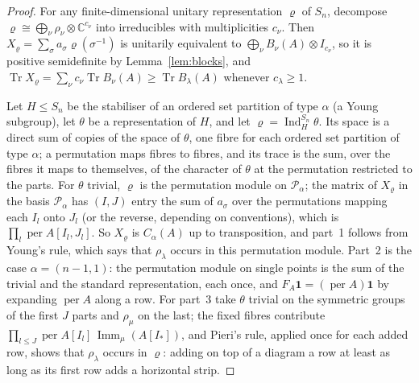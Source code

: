 \documentclass[11pt,a4paper]{article}
\theoremstyle{remark}
\newcommand{\per}{\operatorname{per}}
\newcommand{\Tr}{\operatorname{Tr}}
\newcommand{\Imm}{\operatorname{Imm}}
\newcommand{\one}{\mathbf 1}
\newcommand{\C}{\mathbb C}
\begin{document}
\begin{proof}
For any finite-dimensional unitary representation $\varrho$ of $S_n$, decompose $\varrho\cong\bigoplus_\nu\rho_\nu\otimes\C^{c_\nu}$ into irreducibles with multiplicities $c_\nu$. Then $X_\varrho=\sum_\sigma a_\sigma\varrho(\sigma^{-1})$ is unitarily equivalent to $\bigoplus_\nu B_\nu(A)\otimes I_{c_\nu}$, so it is positive semidefinite by Lemma~\ref{lem:blocks}, and $\Tr X_\varrho=\sum_\nu c_\nu\Tr B_\nu(A)\ge\Tr B_\lambda(A)$ whenever $c_\lambda\ge1$.

Let $H\le S_n$ be the stabiliser of an ordered set partition of type $\alpha$ (a Young subgroup), let $\theta$ be a representation of $H$, and let $\varrho=\operatorname{Ind}_H^{S_n}\theta$. Its space is a direct sum of copies of the space of $\theta$, one fibre for each ordered set partition of type $\alpha$; a permutation maps fibres to fibres, and its trace is the sum, over the fibres it maps to themselves, of the character of $\theta$ at the permutation restricted to the parts. For $\theta$ trivial, $\varrho$ is the permutation module on $\mathcal P_\alpha$; the matrix of $X_\varrho$ in the basis $\mathcal P_\alpha$ has $(I,J)$ entry the sum of $a_\sigma$ over the permutations mapping each $I_l$ onto $J_l$ (or the reverse, depending on conventions), which is $\prod_l\per A[I_l,J_l]$. So $X_\varrho$ is $C_\alpha(A)$ up to transposition, and part~1 follows from Young's rule, which says that $\rho_\lambda$ occurs in this permutation module. Part~2 is the case $\alpha=(n-1,1)$: the permutation module on single points is the sum of the trivial and the standard representation, each once, and $F_A\one=(\per A)\one$ by expanding $\per A$ along a row. For part~3 take $\theta$ trivial on the symmetric groups of the first $J$ parts and $\rho_\mu$ on the last; the fixed fibres contribute $\prod_{l\le J}\per A[I_l]\,\Imm_\mu(A[I_*])$, and Pieri's rule, applied once for each added row, shows that $\rho_\lambda$ occurs in $\varrho$: adding on top of a diagram a row at least as long as its first row adds a horizontal strip.
\end{proof}
\end{document}
